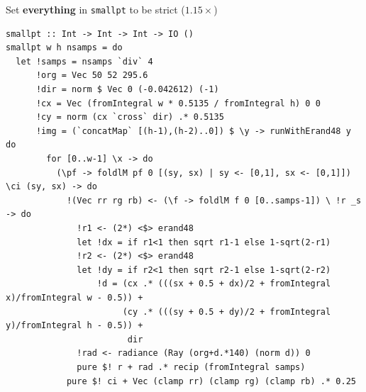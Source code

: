 \documentclass[8pt]{beamer}
\begin{document}
\begin{frame}[fragile]{Set \textbf{everything} in \texttt{smallpt} to be strict ($1.15\times$)}
\begin{verbatim}
smallpt :: Int -> Int -> Int -> IO ()
smallpt w h nsamps = do
  let !samps = nsamps `div` 4
      !org = Vec 50 52 295.6
      !dir = norm $ Vec 0 (-0.042612) (-1)
      !cx = Vec (fromIntegral w * 0.5135 / fromIntegral h) 0 0
      !cy = norm (cx `cross` dir) .* 0.5135
      !img = (`concatMap` [(h-1),(h-2)..0]) $ \y -> runWithErand48 y do
        for [0..w-1] \x -> do
          (\pf -> foldlM pf 0 [(sy, sx) | sy <- [0,1], sx <- [0,1]]) \ci (sy, sx) -> do
            !(Vec rr rg rb) <- (\f -> foldlM f 0 [0..samps-1]) \ !r _s -> do
              !r1 <- (2*) <$> erand48
              let !dx = if r1<1 then sqrt r1-1 else 1-sqrt(2-r1)
              !r2 <- (2*) <$> erand48
              let !dy = if r2<1 then sqrt r2-1 else 1-sqrt(2-r2)
                  !d = (cx .* (((sx + 0.5 + dx)/2 + fromIntegral x)/fromIntegral w - 0.5)) +
                       (cy .* (((sy + 0.5 + dy)/2 + fromIntegral y)/fromIntegral h - 0.5)) + 
                        dir
              !rad <- radiance (Ray (org+d.*140) (norm d)) 0
              pure $! r + rad .* recip (fromIntegral samps)
            pure $! ci + Vec (clamp rr) (clamp rg) (clamp rb) .* 0.25
\end{verbatim}


\end{frame}


\end{document}
